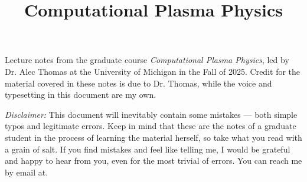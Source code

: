 \documentclass[a4paper,12pt]{article}
\title{Computational Plasma Physics\vspace{-3em}}
\date{}
\begin{document}

    \maketitle

    Lecture notes from the graduate course \textit{Computational Plasma Physics}, led by Dr. Alec Thomas at the University of Michigan in the Fall of 2025. Credit for the material covered in these notes is due to Dr. Thomas, while the voice and typesetting in this document are my own.

    \textit{Disclaimer:} This document will inevitably contain some mistakes --- both simple typos and legitimate errors. Keep in mind that these are the notes of a graduate student in the process of learning the material herself, so take what you read with a grain of salt. If you find mistakes and feel like telling me, I would be grateful and happy to hear from you, even for the most trivial of errors. You can reach me by email at.

    \restoregeometry
    \newpage

    \tableofcontents
    
\end{document}
